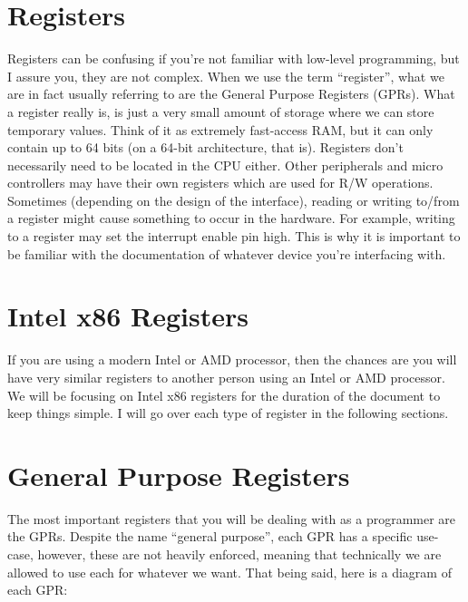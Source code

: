 \documentclass{article}
\begin{document}
\section{Registers}

	Registers can be confusing if you’re not familiar with low-level programming, but I assure you, they are not complex. When 
   we use the term “register”, what we are in fact usually referring to are the General Purpose Registers (GPRs). What 
   a register really is, is just a very small amount of storage where we can store temporary values. Think of 
   it as extremely fast-access RAM, but it can only contain up to 64 bits (on a 64-bit architecture, that is). 
   Registers don’t necessarily need to be located in the CPU either. Other peripherals and micro controllers may have their own 
   registers which are used for R/W operations. Sometimes (depending on the design of the interface), reading or writing to/from a 
   register might cause something to occur in the hardware. For example, writing to a register may set the interrupt enable 
   pin high. This is why it is important to be familiar with the documentation of whatever device you’re interfacing with. 

\section{Intel x86 Registers}

	If you are using a modern Intel or AMD processor, then the chances are you will have very similar registers 
   to another person using an Intel or AMD processor. We will be focusing on Intel x86 registers for the duration 
   of the document to keep things simple. I will go over each type of register in the following sections. 

\section{General Purpose Registers}

	The most important registers that you will be dealing with as a programmer are the GPRs. Despite the name “general 
   purpose”, each GPR has a specific use-case, however, these are not heavily enforced, meaning that technically we are allowed to 
   use each for whatever we want. That being said, here is a diagram of each GPR:\\

\end{document}
